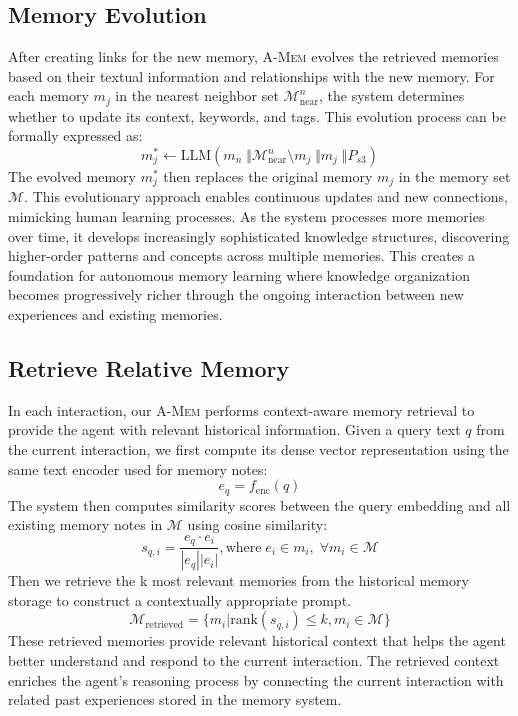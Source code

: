 \documentclass{article}
\newcommand{\ours}{\textsc{A-Mem}\xspace}
\begin{document}
\subsection{Memory Evolution}
After creating links for the new memory, \ours evolves the retrieved memories based on their textual information and relationships with the new memory. For each memory $m_j$ in the nearest neighbor set $\mathcal{M}_{\text{near}}^n$, the system determines whether to update its context, keywords, and tags. This evolution process can be formally expressed as:
\begin{equation}
    m_j^* \leftarrow   \text{LLM} (m_n \; \Vert  \mathcal{M}_{\text{near}}^n \setminus m_j  \;  \Vert m_j \;  \Vert P_{s3})
\end{equation}
The evolved memory $m_j^*$ then replaces the original memory $m_j$ in the memory set $\mathcal{M}$. This evolutionary approach enables continuous updates and new connections, mimicking human learning processes. As the system processes more memories over time, it develops increasingly sophisticated knowledge structures, discovering higher-order patterns and concepts across multiple memories. This creates a foundation for autonomous memory learning where knowledge organization becomes progressively richer through the ongoing interaction between new experiences and existing memories.

\subsection{Retrieve Relative Memory}
In each interaction, our \ours performs context-aware memory retrieval to provide the agent with relevant historical information. Given a query text $q$ from the current interaction, we first compute its dense vector representation using the same text encoder used for memory notes:
\begin{equation}
e_q = f_{\text{enc}}(q)
\end{equation}
The system then computes similarity scores between the query embedding and all existing memory notes in $\mathcal{M}$ using cosine similarity:
\begin{equation}
s_{q,i} = \frac{e_q \cdot e_i}{|e_q| |e_i|}, \text{where} \;  e_i \in m_i,\; \forall m_i \in \mathcal{M}
\end{equation}
Then we retrieve the k most relevant memories from the historical memory storage to construct a contextually appropriate prompt.
\begin{equation}
\mathcal{M}_{\text{retrieved}} = \{m_i | \text{rank}(s_{q,i}) \leq k, m_i \in \mathcal{M}\}
\end{equation}
These retrieved memories provide relevant historical context that helps the agent better understand and respond to the current interaction. The retrieved context enriches the agent's reasoning process by connecting the current interaction with related past experiences stored in the memory system.
\end{document}
